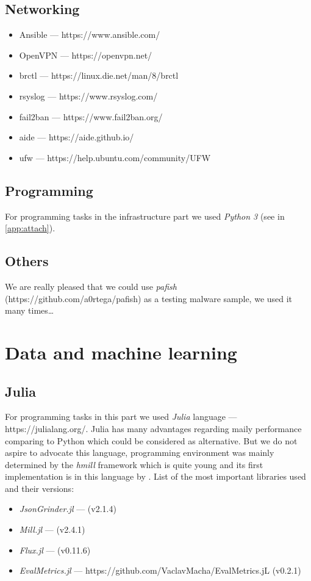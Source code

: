 \subsection*{Networking}
\begin{itemize}
  \itemsep0em 
  \item Ansible --- https://www.ansible.com/
  \item OpenVPN --- https://openvpn.net/
  \item brctl --- https://linux.die.net/man/8/brctl
  \item rsyslog --- https://www.rsyslog.com/
  \item fail2ban --- https://www.fail2ban.org/
  \item aide --- https://aide.github.io/
  \item ufw --- https://help.ubuntu.com/community/UFW
\end{itemize}

\subsection*{Programming}
For programming tasks in the infrastructure part we used \emph{Python 3} (see in \ref{app:attach}).
\subsection*{Others}
We are really pleased that we could use \emph{pafish} (https://github.com/a0rtega/pafish) as a testing malware sample, we used it many times\dots

\section*{Data and machine learning}
\subsection*{Julia}
For programming tasks in this part we used \emph{Julia} language --- https://julialang.org/. Julia has many advantages regarding maily performance comparing to Python which could be considered as alternative. But we do not aspire to advocate this language, programming environment was mainly determined by the \emph{hmill} framework which is quite young and its first implementation is in this language by \cite{Mandlik2020}. List of the most important libraries used and their versions:
\begin{itemize}
  \itemsep0em 
  \item \emph{JsonGrinder.jl} --- \cite{Pevny2019} (v2.1.4)
  \item \emph{Mill.jl} --- \cite{Pevny2018} (v2.4.1)
  \item \emph{Flux.jl} --- \cite{Innes2018a, Innes2018} (v0.11.6)
  \item \emph{EvalMetrics.jl} --- https://github.com/VaclavMacha/EvalMetrics.jL (v0.2.1)
\end{itemize}
